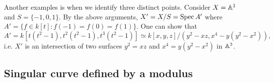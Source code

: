 \documentclass[letterpaper, 12pt]{article}
\begin{document}
\begin{center}
\end{center}

Another examples is when we identify three distinct points.
Consider $X = \mathbb{A}^1$ and $S = \{-1, 0, 1\}$.
By the above arguments, $X' = X / S = \mathrm{Spec}\, A'$ where $A' = \{f \in k[t]: f(-1) = f(0) = f(1)\}$.
One can show that
$$
A' = k[t(t^2 - 1), t^2(t^2 - 1), t^3(t^2 - 1)] \simeq k[x, y, z] / (y^2 - xz, x^4 - y(y^2 - x^2)),
$$
i.e. $X'$ is an intersection of two surfaces $y^2 = xz$ and $x^4 = y(y^2 - x^2)$ in $\mathbb{A}^3$.

\begin{center}
\end{center}



\subsection{Singular curve defined by a modulus}
\end{document}
